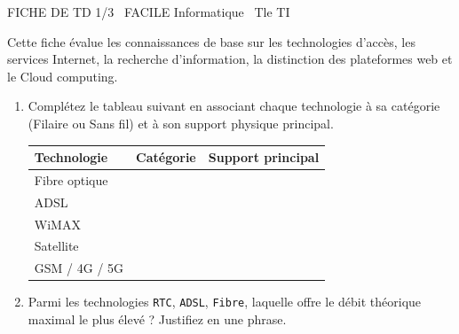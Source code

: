 \documentclass[11pt]{article}
\begin{document}
\begin{tcolorbox}[enhanced,colback=popink,colframe=popink,arc=10pt,boxrule=0pt,left=12pt,right=12pt,top=9pt,bottom=9pt]
{\color{white}\popxbold\small FICHE DE TD 1/3 \textbullet\ FACILE \hfill Informatique \textbullet\ Tle TI\par}
\end{tcolorbox}
\vspace{4pt}
\noindent Cette fiche évalue les connaissances de base sur les technologies d'accès, les services Internet, la recherche d'information, la distinction des plateformes web et le Cloud computing.

\begin{exercice}
\begin{enumerate}
    \item Complétez le tableau suivant en associant chaque technologie à sa catégorie (Filaire ou Sans fil) et à son support physique principal.
    \begin{tabular}{|l|c|c|}
        \hline
        \textbf{Technologie} & \textbf{Catégorie} & \textbf{Support principal} \\
        \hline
        Fibre optique & & \\
        ADSL & & \\
        WiMAX & & \\
        Satellite & & \\
        GSM / 4G / 5G & & \\
        \hline
    \end{tabular}
    \item Parmi les technologies \texttt{RTC}, \texttt{ADSL}, \texttt{Fibre}, laquelle offre le débit théorique maximal le plus élevé ? Justifiez en une phrase.
\end{enumerate}
\end{exercice}
\end{document}
